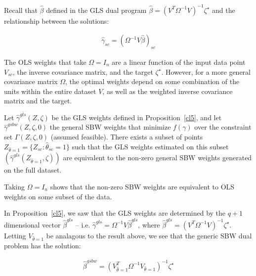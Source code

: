 \begin{remark}\label{rmk:olsweightsfixed}
    Recall that $\hat{\beta}$ defined in the GLS dual program $\hat{\beta} = (V^T\Omega^{-1}V)^{-1}\zeta^\star$ and the relationship between the solutions: 
    
    \begin{align*}
        \hat{\gamma}_{sc} = (\Omega^{-1}V\hat{\beta})_{sc}
    \end{align*}

    The OLS weights that take $\Omega = I_n$ are a linear function of the input data point $V_{sc}$, the inverse covariance matrix, and the target $\zeta^\star$. However, for a more general covariance matrix $\Omega$, the optimal weights depend on some combination of the units within the entire dataset $V$, as well as the weighted inverse covariance matrix and the target. 
\end{remark}

\begin{proposition}\label{cl6}
    Let $\hat{\gamma}^{gls}(Z, \zeta)$ be the GLS weights defined in Proposition~\ref{cl5}, and let $\hat{\gamma}^{gsbw}(Z, \zeta, 0)$  the general SBW weights that minimize $f(\gamma)$ over the constraint set $\Gamma(Z, \zeta, 0)$ (assumed feasible). There exists a subset of points $Z_{\hat{\theta} = 1} = \{Z_{sc}: \hat{\theta}_{sc} = 1\}$ such that the GLS weights estimated on this subset $(\hat{\gamma}^{gls}(Z_{\hat{\theta} = 1}, \zeta))$ are equivalent to the non-zero general SBW weights generated on the full dataset.
\end{proposition}

\begin{remark}
    Taking $\Omega = I_n$ shows that the non-zero SBW weights are equivalent to OLS weights on some subset of the data. 
\end{remark}

\begin{remark}
    In Proposition~\ref{cl5}, we saw that the GLS weights are determined by the $q + 1$ dimensional vector $\hat{\beta}^{gls}$ -- i.e. $\hat{\gamma}^{gls} = \Omega^{-1}V\hat{\beta}^{gls}$, where $\hat{\beta}^{gls} = (V^T\Omega^{-1}V)^{-1}\zeta^\star$. Letting $V_{\hat{\theta}=1}$ be analagous to the result above, we see that the generic SBW dual problem has the solution:
    
    \begin{align}
    \hat{\beta}^{gsbw} = (V_{\hat{\theta}=1}^T\Omega^{-1}V_{\hat{\theta}=1})^{-1}\zeta^\star
    \end{align}
\end{remark}

